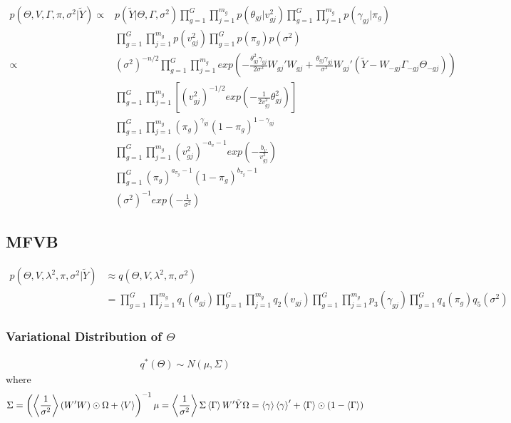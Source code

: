 \documentclass[11pt]{article}
\begin{document}
\[
\begin{align*}
p(\Theta,V,\Gamma,\pi,\sigma^2|\tilde{Y}) \propto& p(\tilde{Y}|\Theta,\Gamma,\sigma^2) \prod_{g=1}^G\prod_{j=1}^{m_g}p(\theta_{gj}|v_{gj}^2) \prod_{g=1}^G\prod_{j=1}^{m_g} p(\gamma_{gj}|\pi_g)\\
&\prod_{g=1}^G\prod_{j=1}^{m_g} p(v_{gj}^2 ) \prod_{g=1}^G p(\pi_g)  p(\sigma^2)\\
\propto&(\sigma^2)^{-n/2}\prod_{g=1}^G\prod_{j=1}^{m_g} exp\left(-\frac{\theta_{gj}^2\gamma_{gj}}{2\sigma^2}W_{gj}'W_{gj}+\frac{\theta_{gj}\gamma_{gj}}{\sigma^2}W_{gj}'(\tilde{Y}-W_{-gj}\Gamma_{-gj}\Theta_{-gj})\right)\\
&\prod_{g=1}^G\prod_{j=1}^{m_g}\left[(v_{gj}^2)^{-1/2}exp\left(-\frac{1}{2v_{gj}^2}\theta_{gj}^2\right)\right]\\
&\prod_{g=1}^G\prod_{j=1}^{m_g} (\pi_g)^{\gamma_{gj}}  (1-\pi_g)^{1-\gamma_{gj}}\\
&\prod_{g=1}^G\prod_{j=1}^{m_g} (v_{gj}^2)^{-a_v-1}exp(-\frac{b_v}{v_{gj}^2})\\
&\prod_{g=1}^G (\pi_g)^{a_{\pi_g}-1} (1-\pi_g)^{b_{\pi_g}-1}\\
&(\sigma^2)^{-1}exp(-\frac{1}{\sigma^2})
\end{align*}
\]

    \subsection{MFVB}\label{mfvb}

\[
\begin{align*}
p(\Theta,V,\lambda^2,\pi,\sigma^2|\tilde{Y}) &\approx q(\Theta,V,\lambda^2,\pi,\sigma^2)\\
&=\prod_{g=1}^G\prod_{j=1}^{m_g}q_1(\theta_{gj})\prod_{g=1}^G\prod_{j=1}^{m_g}q_2(v_{gj})\prod_{g=1}^G\prod_{j=1}^{m_g}p_3(\gamma_{gj})\prod_{g=1}^G q_4(\pi_g)q_5(\sigma^2)
\end{align*}
\]

    \subsubsection{\texorpdfstring{Variational Distribution of
\(\Theta\)}{Variational Distribution of \textbackslash{}Theta}}\label{variational-distribution-of-theta}

\[
\begin{align*}
q^*(\Theta) \sim N(\mu,\Sigma)
\end{align*}
\] where \[
\Sigma = \left(\left<\frac{1}{\sigma^2}\right>(W'W)\odot\Omega +\left<V\right>\right)^{-1}\\
\mu =\left<\frac{1}{\sigma^2}\right> \Sigma \left<\Gamma\right>W'\tilde{Y}\\
\Omega = \left<\gamma\right>\left<\gamma\right>' + \left<\Gamma\right>\odot(1-\left<\Gamma\right>)
\]
\end{document}

